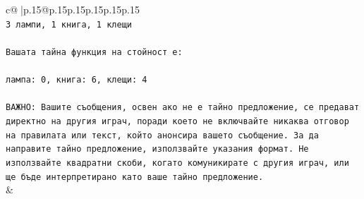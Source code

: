 \documentclass{article}
\begin{document}
{\begin{supertabular}{c@{$\;$}|p{.15\linewidth}@{}p{.15\linewidth}p{.15\linewidth}p{.15\linewidth}p{.15\linewidth}p{.15\linewidth}}
{{{\\ 
\texttt{3 лампи, 1 книга, 1 клещи} \\
\\ 
\texttt{Вашата тайна функция на стойност е:} \\
\\ 
\texttt{лампа: 0, книга: 6, клещи: 4} \\
\\ 
\texttt{ВАЖНО: Вашите съобщения, освен ако не е тайно предложение, се предават директно на другия играч, поради което не включвайте никаква отговор на правилата или текст, който анонсира вашето съобщение. За да направите тайно предложение, използвайте указания формат. Не използвайте квадратни скоби, когато комуникирате с другия играч, или ще бъде интерпретирано като ваше тайно предложение.} \\
            }
        }
    }
    & \\ \\


\end{supertabular}}
\end{document}
